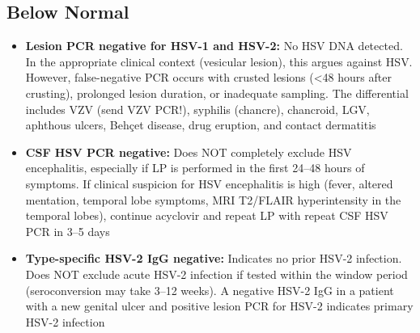 \subsection*{Below Normal}
\begin{itemize}
  \item \textbf{Lesion PCR negative for HSV-1 and HSV-2:} No HSV DNA detected. In the appropriate clinical context (vesicular lesion), this argues against HSV. However, false-negative PCR occurs with crusted lesions (<48 hours after crusting), prolonged lesion duration, or inadequate sampling. The differential includes VZV (send VZV PCR!), syphilis (chancre), chancroid, LGV, aphthous ulcers, Behçet disease, drug eruption, and contact dermatitis
  \item \textbf{CSF HSV PCR negative:} Does NOT completely exclude HSV encephalitis, especially if LP is performed in the first 24--48 hours of symptoms. If clinical suspicion for HSV encephalitis is high (fever, altered mentation, temporal lobe symptoms, MRI T2/FLAIR hyperintensity in the temporal lobes), continue acyclovir and repeat LP with repeat CSF HSV PCR in 3--5 days
  \item \textbf{Type-specific HSV-2 IgG negative:} Indicates no prior HSV-2 infection. Does NOT exclude acute HSV-2 infection if tested within the window period (seroconversion may take 3--12 weeks). A negative HSV-2 IgG in a patient with a new genital ulcer and positive lesion PCR for HSV-2 indicates primary HSV-2 infection
\end{itemize}

